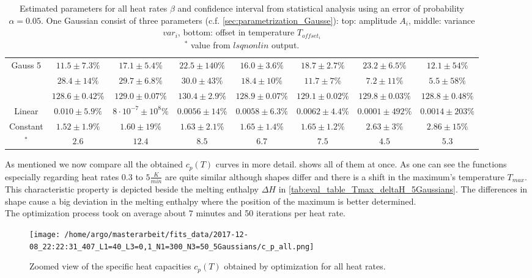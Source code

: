 \documentclass{scrartcl}[12pt, halfparskip]
\numberwithin{equation}{section}
\numberwithin{figure}{section}
\numberwithin{table}{section}
\begin{document}
\begin{landscape}
\begin{table}[H]
\begin{tabular}{| c | c | c | c | c | c | c | c |}
		Gauss 5 & $11.5 \pm 7.3\%$ & $17.1 \pm 5.4\%$ & $22.5 \pm 140\%$ & $16.0 \pm 3.6\%$ & $18.7 \pm 2.7\%$ & $23.2 \pm 6.5\%$ & $12.1 \pm 54\%$ \\
		& $28.4 \pm 14\%$ & $29.7 \pm 6.8\%$ & $30.0 \pm 43\%$ & $18.4 \pm 10\%$ & $11.7 \pm 7\%$ & $7.2 \pm 11\%$ & $5.5 \pm 58\%$ \\
		& $128.6 \pm 0.42\%$ & $129.0 \pm 0.07\%$ & $130.4 \pm 2.9\%$ & $128.9 \pm 0.07\%$ & $129.1 \pm 0.02\%$ & $129.8 \pm 0.03\%$ & $128.8 \pm 0.48\%$ \\ \hline
		Linear & $0.010 \pm 5.9\%$ & $8 \cdot 10^{-7} \pm 10^8\%$ & $0.0056 \pm 14\%$ & $0.0058 \pm 6.3\%$ & $0.0062 \pm 4.4\%$ & $0.0001 \pm 492\%$ & $0.0014 \pm 203\%$ \\
		Constant & $1.52 \pm 1.9\%$ & $1.60 \pm 19\%$ & $1.63 \pm 2.1\%$ & $1.65 \pm 1.4\%$ & $1.65 \pm 1.2\%$ & $2.63 \pm 3\%$ & $2.86 \pm 15\%$ \\ \hline \hline
		[NOC1]$^*$ & $2.6$ & $12.4$ & $8.5$ & $6.7$ & $7.5$ & $4.5$ & $5.3$ \\ \hline
	\end{tabular}
	\caption{Estimated parameters for all heat rates $\beta$ and confidence interval from statistical analysis using an error of probability $\alpha=0.05$. One Gaussian consist of three parameters (c.f. \cref{sec:parametrization_Gausse}): top: amplitude $A_i$, middle: variance $var_i$, bottom: offset in temperature $T_{offset_i}$ \\
	$^*$ value from $lsqnonlin$ output.}
	\label{tab:parameter_table_5Gaussians}
\end{table}

\end{landscape}
\newpage

As mentioned we now compare all the obtained $c_p(T)$ curves in more detail.  shows all of them at once. As one can see the functions especially regarding heat rates $0.3$ to $5 \frac{K}{min}$ are quite similar although shapes differ and there is a shift in the maximum's temperature $T_{max}$. This characteristic property is depicted beside the melting enthalpy $\Delta H$ in \cref{tab:eval_table_Tmax_deltaH_5Gaussians}. The differences in shape cause a big deviation in the melting enthalpy where the position of the maximum is better determined. \\
The optimization process took on average about $7$ minutes and 50 iterations per heat rate.



\begin{figure}[H]
	\centering
	\texttt{[image: /home/argo/masterarbeit/fits\_data/2017-12-08\_22:22:31\_407\_L1=40\_L3=0,1\_N1=300\_N3=50\_5Gaussians/c\_p\_all.png]}
	\caption{Zoomed view of the specific heat capacities $c_p(T)$ obtained by optimization for all heat rates.}
	\label{fig:5Gaussians_all_c_p}
\end{figure}
\end{document}
